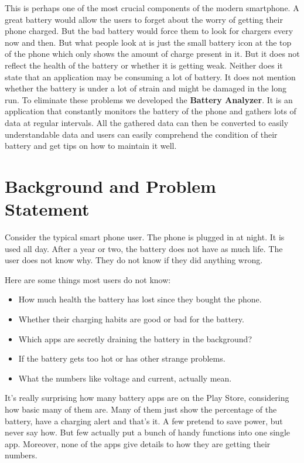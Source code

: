 \documentclass[12pt,a4paper]{report}
\begin{document}
This is perhaps one of the most crucial components of the modern smartphone. A great battery would allow the users to forget about the worry of getting their phone charged. But the bad battery would force them to look for chargers every now and then. But what people look at is just the small battery icon at the top of the phone which only shows the amount of charge present in it. But it does not reflect the health of the battery or whether it is getting weak. Neither does it state that an application may be consuming a lot of battery. It does not mention whether the battery is under a lot of strain and might be damaged in the long run. To eliminate these problems we developed the \textbf{Battery Analyzer}. It is an application that constantly monitors the battery of the phone and gathers lots of data at regular intervals. All the gathered data can then be converted to easily understandable data and users can easily comprehend the condition of their battery and get tips on how to maintain it well.

\section{Background and Problem Statement}

Consider the typical smart phone user. The phone is plugged in at night. It is used all day. After a year or two, the battery does not have as much life. The user does not know why. They do not know if they did anything wrong.

Here are some things most users do not know:

\begin{itemize}
    \item How much health the battery has lost since they bought the phone.
    \item Whether their charging habits are good or bad for the battery.
    \item Which apps are secretly draining the battery in the background?
    \item If the battery gets too hot or has other strange problems.
    \item What the numbers like voltage and current, actually mean.
\end{itemize}

It's really surprising how many battery apps are on the Play Store, considering how basic many of them are. Many of them just show the percentage of the battery, have a charging alert and that's it. A few pretend to save power, but never say how. But few actually put a bunch of handy functions into one single app. Moreover, none of the apps give details to how they are getting their numbers.
\end{document}
